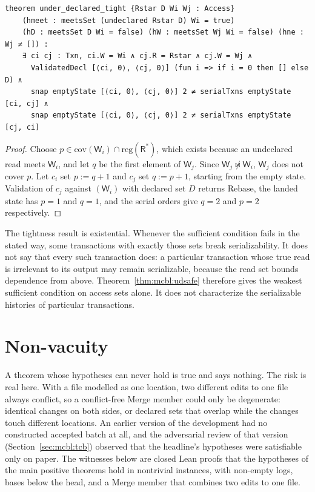 \documentclass[11pt,letterpaper]{article}
\theoremstyle{definition}
\theoremstyle{remark}
\newcommand{\R}{\mathsf{R}}
\newcommand{\W}{\mathsf{W}}
\newcommand{\nmeets}{\not\bowtie}
\newcommand{\op}[1]{\mathrm{#1}}
\newcommand{\covd}{\op{cov}}
\newcommand{\reg}{\op{reg}}
\newcommand{\Rb}{\mathrm{Rebase}}
\begin{document}
\begin{lstlisting}[language=Lean,caption={Tightness of the sufficient condition (\texttt{YonedaTx/UnderDeclared.lean})},label={lst:mcbl:udtight}]
theorem under_declared_tight {Rstar D Wi Wj : Access}
    (hmeet : meetsSet (undeclared Rstar D) Wi = true)
    (hD : meetsSet D Wi = false) (hW : meetsSet Wj Wi = false) (hne : Wj ≠ []) :
    ∃ ci cj : Txn, ci.W = Wi ∧ cj.R = Rstar ∧ cj.W = Wj ∧
      ValidatedDecl [⟨ci, 0⟩, ⟨cj, 0⟩] (fun i => if i = 0 then [] else D) ∧
      snap emptyState [⟨ci, 0⟩, ⟨cj, 0⟩] 2 ≠ serialTxns emptyState [ci, cj] ∧
      snap emptyState [⟨ci, 0⟩, ⟨cj, 0⟩] 2 ≠ serialTxns emptyState [cj, ci]
\end{lstlisting}

\begin{proof}
Choose $p\in\covd(\W_i)\cap\reg(\R^{*})$, which exists because an undeclared read meets $\W_i$, and let $q$ be the first element of $\W_j$. Since $\W_j\nmeets\W_i$, $\W_j$ does not cover $p$. Let $c_i$ set $p:=q+1$ and $c_j$ set $q:=p+1$, starting from the empty state. Validation of $c_j$ against $(\W_i)$ with declared set $D$ returns $\Rb$, the landed state has $p=1$ and $q=1$, and the serial orders give $q=2$ and $p=2$ respectively.
\end{proof}

The tightness result is existential. Whenever the sufficient condition fails in the stated way, some transactions with exactly those sets break serializability. It does not say that every such transaction does: a particular transaction whose true read is irrelevant to its output may remain serializable, because the read set bounds dependence from above. Theorem~\ref{thm:mcbl:udsafe} therefore gives the weakest sufficient condition on access sets alone. It does not characterize the serializable histories of particular transactions.

\section{Non-vacuity}
\label{sec:mcbl:witnesses}

A theorem whose hypotheses can never hold is true and says nothing. The risk is real here. With a file modelled as one location, two different edits to one file always conflict, so a conflict-free Merge member could only be degenerate: identical changes on both sides, or declared sets that overlap while the changes touch different locations. An earlier version of the development had no constructed accepted batch at all, and the adversarial review of that version (Section~\ref{sec:mcbl:tcb}) observed that the headline's hypotheses were satisfiable only on paper. The witnesses below are closed Lean proofs that the hypotheses of the main positive theorems hold in nontrivial instances, with non-empty logs, bases below the head, and a Merge member that combines two edits to one file.
\end{document}
